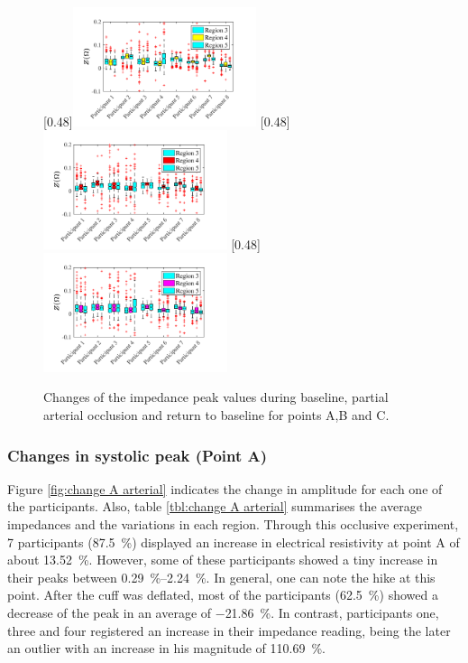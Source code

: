 \begin{figure}
	\null\hfill%
	[0.48\textwidth]{\includegraphics[width=0.48\textwidth, trim={0.5cm 0cm 1.5cm 0 cm}, clip]{figure_apa_5a}}%
	\hfill%
	[0.48\textwidth]{\includegraphics[width=0.48\textwidth, trim={0.5cm 0cm 1.5cm 0 cm}, clip]{figure_apa_5b}}%
	\hfill%
	[0.48\textwidth]{\includegraphics[width=0.48\textwidth, trim={0.5cm 0cm 1.5cm 0 cm}, clip]{figure_apa_5c}}%
	\null%
	\caption{Changes of the impedance peak values during baseline, partial arterial occlusion and return to baseline for points A,B and C.}
	\label{fig:iPG change points arterial}
\end{figure}

\subsubsection{Changes in systolic peak (Point A)}
\label{section apa 2.2.1}
Figure \ref{fig:change A arterial} indicates the change in amplitude for each one of the participants. Also, table \ref{tbl:change A arterial} summarises the average impedances and the variations in each region. Through this occlusive experiment, 7 participants (\SI{87.5}{\percent}) displayed an increase in electrical resistivity at point A of about \SI{13.52}{\percent}. However, some of these participants showed a tiny increase in their peaks between \SIrange{0.29}{2.24}{\percent}. In general, one can note the hike at this point. After the cuff was deflated, most of the participants (\SI{62.5}{\percent}) showed a decrease of the peak in an average of \SI{-21.86}{\percent}.  In contrast, participants one, three and four registered an increase in their impedance reading, being the later an outlier with an increase in his magnitude of \SI{110.69}{\percent}.

